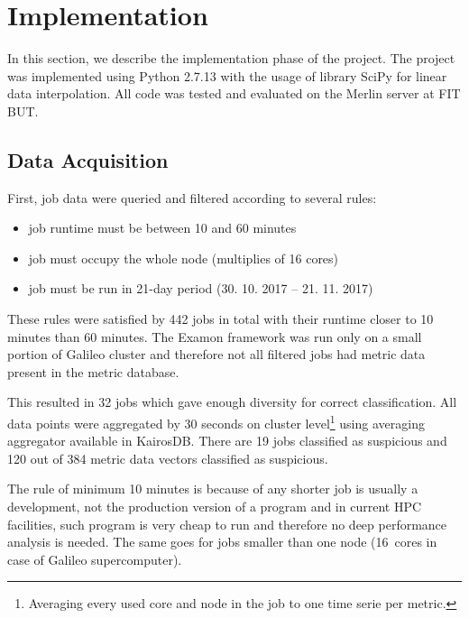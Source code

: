 \section{Implementation}
In this section, we describe the implementation phase of the project. The project was implemented using Python 2.7.13 with the usage of library SciPy\cite{scipy} for linear data interpolation. All code was tested and evaluated on the Merlin server at FIT BUT.

\label{sec:implementation}

\subsection{Data Acquisition}
\label{sec:data-filter}
First, job data were queried and filtered according to several rules:
\begin{itemize}
    \setlength\itemsep{0em}
    \item job runtime must be between 10 and 60 minutes
    \item job must occupy the whole node (multiplies of 16 cores)
    \item job must be run in 21-day period (30. 10. 2017 -- 21. 11. 2017)
\end{itemize}

These rules were satisfied by 442 jobs in total with their runtime closer to 10 minutes than 60 minutes. The Examon framework was run only on a small portion of Galileo cluster and therefore not all filtered jobs had metric data present in the metric database.


This resulted in 32 jobs which gave enough diversity for correct classification. All data points were aggregated by 30 seconds on cluster level\footnote{Averaging every used core and node in the job to one time serie per metric.} using averaging aggregator available in KairosDB. There are 19 jobs classified as suspicious and 120 out of 384 metric data vectors classified as suspicious.

The rule of minimum 10 minutes is because of any shorter job is usually a development, not the production version of a program and in current HPC facilities, such program is very cheap to run and therefore no deep performance analysis is needed. The same goes for jobs smaller than one node (16~cores in case of Galileo supercomputer).


